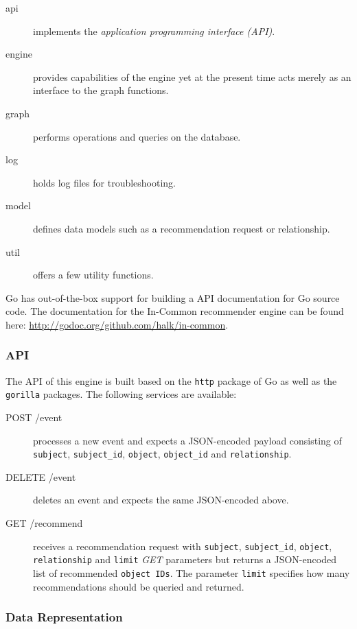 \begin{description}
    \item[api] implements the \emph{application programming interface (API)}.
    \item[engine] provides capabilities of the engine yet at the present time acts merely as an interface to the graph functions.
    \item[graph] performs operations and queries on the database.
    \item[log] holds log files for troubleshooting.
    \item[model] defines data models such as a recommendation request or relationship.
    \item[util] offers a few utility functions.
\end{description}

Go has out-of-the-box support for building a API documentation for Go source code. The documentation for the In-Common recommender engine can be found here: \url{http://godoc.org/github.com/halk/in-common}.

\subsubsection{API}

The API of this engine is built based on the \texttt{http} package of Go as well as the \texttt{gorilla} packages. The following services are available:

\begin{description}
    \item[POST /event] processes a new event and expects a JSON-encoded payload consisting of \texttt{subject}, \texttt{subject_id}, \texttt{object}, \texttt{object_id} and \texttt{relationship}.
    \item[DELETE /event] deletes an event and expects the same JSON-encoded above.
    \item[GET /recommend] receives a recommendation request with \texttt{subject}, \texttt{subject_id}, \texttt{object}, \texttt{relationship} and \texttt{limit} \emph{GET} parameters but returns a JSON-encoded list of recommended \texttt{object IDs}. The parameter \texttt{limit} specifies how many recommendations should be queried and returned.
\end{description}

\subsubsection{Data Representation}

